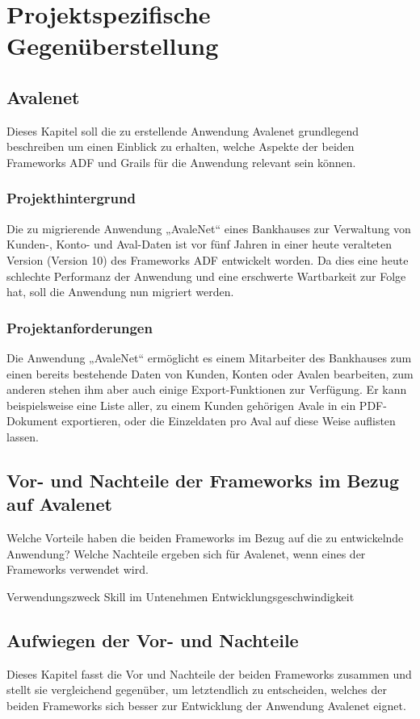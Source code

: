 \section{Projektspezifische Gegenüberstellung}
\subsection{Avalenet}
Dieses Kapitel soll die zu erstellende Anwendung Avalenet grundlegend beschreiben um einen Einblick zu erhalten, welche Aspekte der beiden Frameworks ADF und Grails für die Anwendung relevant sein können.
\subsubsection{Projekthintergrund}
Die zu migrierende Anwendung „AvaleNet“ eines Bankhauses zur Verwaltung von Kunden-, Konto- und Aval-Daten ist vor fünf Jahren in einer heute veralteten Version (Version 10) des Frameworks ADF entwickelt worden. Da dies eine heute schlechte Performanz der Anwendung und eine erschwerte Wartbarkeit zur Folge hat, soll die Anwendung nun migriert werden.
\subsubsection{Projektanforderungen}
Die Anwendung „AvaleNet“ ermöglicht es einem Mitarbeiter des Bankhauses zum einen bereits bestehende Daten von Kunden, Konten oder Avalen bearbeiten, zum anderen stehen ihm aber auch einige Export-Funktionen zur Verfügung. Er kann beispielsweise eine Liste aller, zu einem Kunden gehörigen Avale in ein PDF-Dokument exportieren, oder die Einzeldaten pro Aval auf diese Weise auflisten lassen.


\subsection{Vor- und Nachteile der Frameworks im Bezug auf Avalenet}
Welche Vorteile haben die beiden Frameworks im Bezug auf die zu entwickelnde Anwendung?
Welche Nachteile ergeben sich für Avalenet, wenn eines der Frameworks verwendet wird.

Verwendungszweck
Skill im Untenehmen
Entwicklungsgeschwindigkeit

\subsection{Aufwiegen der Vor- und Nachteile}
Dieses Kapitel fasst die Vor und Nachteile der beiden Frameworks zusammen und stellt sie vergleichend gegenüber, um letztendlich zu entscheiden, welches der beiden Frameworks sich besser zur Entwicklung der Anwendung Avalenet eignet.